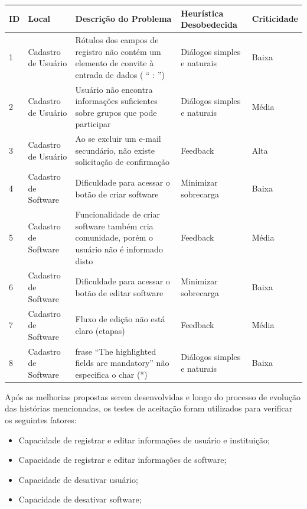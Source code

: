 \begin{table}[h!]
\begin{tabular}{|l|p{3cm}|p{6cm}|p{3cm}|l|}
\hline
\textbf{ID} & \textbf{Local} & \textbf{Descrição do Problema}                                                                                     & \textbf{Heurística Desobedecida} & \textbf{Criticidade} \\ \hline
1           & Cadastro de Usuário                 & Rótulos dos campos de registro não contém um elemento de convite à entrada de dados ( “ : ”) & Diálogos simples e naturais     & Baixa                \\ \hline
2           & Cadastro de Usuário                 & Usuário não encontra informações suficientes sobre grupos que pode participar  & Diálogos simples e naturais             & Média                \\ \hline
3           & Cadastro de Usuário               & Ao se excluir um e-mail secundário, não existe solicitação de confirmação       & Feedback                & Alta                \\ \hline
4           & Cadastro de Software     & Dificuldade para acessar o botão de criar software
	        & Minimizar sobrecarga          & Baixa                \\ \hline
5           & Cadastro de Software       & Funcionalidade de criar software também cria comunidade, porém o usuário não é informado disto  & Feedback    & Média                \\ \hline
6           & Cadastro de Software    & Dificuldade para acessar o botão de editar software
		    & Minimizar sobrecarga           & Baixa                \\ \hline
7           & Cadastro de Software    & Fluxo de edição não está claro (etapas)
			& Feedback                       & Média                \\ \hline
8           & Cadastro de Software    & frase ``The highlighted fields are mandatory'' não especifica o char (*)
		    &Diálogos simples e naturais     & Baixa                \\ \hline
\end{tabular}
\end{table}

Após as melhorias propostas serem desenvolvidas e longo do processo de evolução das histórias mencionadas, os testes de aceitação foram utilizados para verificar os seguintes fatores:

\begin{itemize}
	\item Capacidade de registrar e editar informações de usuário e instituição;
	\item Capacidade de registrar e editar informações de software;
	\item Capacidade de desativar usuário;
	\item Capacidade de desativar software;
\end{itemize}


